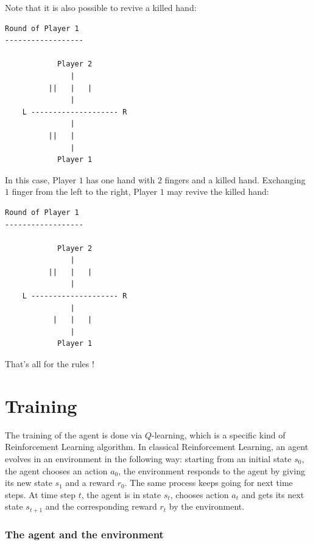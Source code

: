 \documentclass{article}
\begin{document}
Note that it is also possible to revive a killed hand:

\begin{verbatim}
Round of Player 1
------------------

            Player 2                
               |                    
          ||   |   |                
               |                    
    L -------------------- R        
               |                    
          ||   |                    
               |                    
            Player 1                

\end{verbatim}{}

In this case, Player $1$ has one hand with $2$ fingers and a killed hand. Exchanging $1$ finger from the left to the right, Player $1$ may revive the killed hand:

\begin{verbatim}
Round of Player 1
------------------

            Player 2                
               |                    
          ||   |   |                
               |                    
    L -------------------- R        
               |                    
           |   |   |                
               |                    
            Player 1                

\end{verbatim}{}

That's all for the rules !

\section{Training}

The training of the agent is done via $Q$-learning, which is a specific kind of Reinforcement Learning algorithm. In classical Reinforcement Learning, an agent evolves in an environment in the following way: starting from an initial state $s_0$, the agent chooses an action $a_0$, the environment responds to the agent by giving its new state $s_1$ and a reward $r_0$. The same process keeps going for next time steps. At time step $t$, the agent is in state $s_t$, chooses action $a_t$ and gets its next state $s_{t+1}$ and the corresponding reward $r_t$ by the environment. 

\subsubsection*{The agent and the environment}
\end{document}
